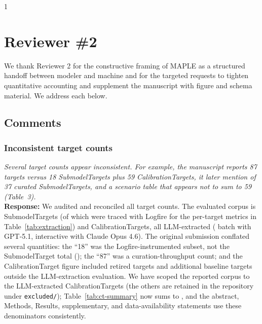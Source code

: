 \documentclass[11pt]{article}
\newcommand{\reviewer}[1]{\textcolor{reviewercolor}{\textit{#1}}}
\newcommand{\response}[1]{\textcolor{responsecolor}{\textbf{Response:} #1}}
\providecommand{\trackchanges}{1}
\newenvironment{revised}{\if1\trackchanges\color{blue}\fi}{}
\begin{document}
\begin{revised}

\end{revised}

\bigskip

\section*{Reviewer \#2}

We thank Reviewer 2 for the constructive framing of MAPLE as a structured handoff between modeler and machine and for the targeted requests to tighten quantitative accounting and supplement the manuscript with figure and schema material. We address each below.

\subsection*{Comments}

\subsubsection*{Inconsistent target counts}
\reviewer{Several target counts appear inconsistent. For example, the manuscript reports 87 targets versus 18 SubmodelTargets plus 59 CalibrationTargets, it later mention of 37 curated SubmodelTargets, and a scenario table that appears not to sum to 59 (Table~3).}\\
\response{We audited and reconciled all target counts. The evaluated corpus is \nYAMLTargets{} SubmodelTargets (of which \nTargets{} were traced with Logfire for the per-target metrics in Table~\ref{tab:extraction}) and \ctTotal{} CalibrationTargets, all LLM-extracted (\ctGPT{} batch with GPT-5.1, \ctClaude{} interactive with Claude Opus 4.6). The original submission conflated several quantities: the ``18'' was the Logfire-instrumented subset, not the SubmodelTarget total (\nYAMLTargets{}); the ``87'' was a curation-throughput count; and the CalibrationTarget figure included retired targets and additional baseline targets outside the LLM-extraction evaluation. We have scoped the reported corpus to the \ctTotal{} LLM-extracted CalibrationTargets (the others are retained in the repository under \texttt{excluded/}); Table~\ref{tab:ct-summary} now sums to \ctTotal{}, and the abstract, Methods, Results, supplementary, and data-availability statements use these denominators consistently.}
\end{document}
